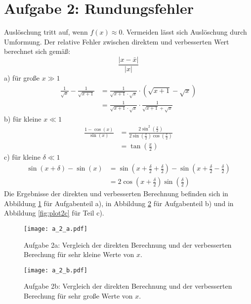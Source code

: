 \section*{Aufgabe 2: Rundungsfehler}
Auslöschung tritt auf, wenn $f(x) \approx 0$. Vermeiden lässt sich Auslöschung durch Umformung.
Der relative Fehler zwischen direktem und verbesserten Wert berechnet sich gemäß:
\begin{equation*}
  \frac{\vert x - \bar{x} \vert}{\vert x \vert}
\end{equation*}
a) für große $x \gg 1$
\begin{align*}
  \frac{1}{\sqrt{x}}-\frac{1}{\sqrt{x+1}} &= \frac{1}{\sqrt{x+1} \cdot \sqrt{x}} \cdot \left(\sqrt{x+1} - \sqrt{x}\right) \\
                                          &= \frac{1}{\sqrt{x+1} \cdot \sqrt{x}} \cdot \frac{1}{\sqrt{x+1}+\sqrt{x}}
\end{align*}
\noindent
b) für kleine $x \ll 1$
\begin{align*}
  \frac{1-\cos \left(x \right)}{\sin \left(x \right)} &= \frac{2 \sin^2 \left(\frac{x}{2}\right)}{2 \sin \left(\frac{x}{2}\right) \cos \left(\frac{x}{2}\right)} \\
                                                      &= \tan \left(\frac{x}{2}\right)
\end{align*}
\noindent
c) für kleine $\delta \ll 1$
\begin{align*}
  \sin \left(x + \delta \right) - \sin \left(x \right) &= \sin \left(x + \frac{\delta}{2} + \frac{\delta}{2}\right) - \sin \left(x + \frac{\delta}{2} - \frac{\delta}{2} \right) \\
                                                       &= 2 \cos \left(x + \frac{\delta}{2}\right) \sin \left(\frac{\delta}{2}\right)
\end{align*}
\noindent
Die Ergebnisse der direkten und verbesserten Berechnung befinden sich in Abbildung \ref{fig:plot2a} für Aufgabenteil a), in  Abbildung \ref{fig:plot2b}
für Aufgabenteil b) und in  Abbildung \ref{fig:plot2c} für Teil c).

\begin{figure}[h]
    \centering
    \texttt{[image: a\_2\_a.pdf]}
    \caption{Aufgabe 2a: Vergleich der direkten Berechnung und der verbesserten Berechung für sehr kleine Werte von $x$.}
    \label{fig:plot2a}
\end{figure}

\FloatBarrier
\begin{figure}[h]
    \centering
    \texttt{[image: a\_2\_b.pdf]}
    \caption{Aufgabe 2b: Vergleich der direkten Berechnung und der verbesserten Berechung für sehr große Werte von $x$.}
    \label{fig:plot2b}
\end{figure}
\FloatBarrier

